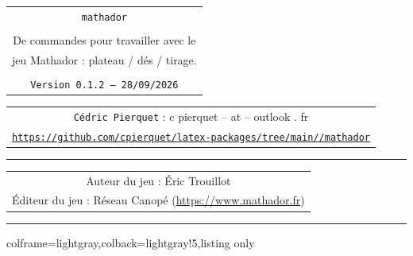 \documentclass[11pt,a4paper]{ltxdoc}
\def\TPversion{0.1.2}
\def\TPdate{28/09/2026}
\begin{document}
\thispagestyle{empty}

\begin{center}
	\begin{minipage}{0.88\linewidth}
		\begin{tcolorbox}[colframe=yellow,colback=yellow!15]
			\begin{center}
				\renewcommand{\arraystretch}{1.25}%
				\begin{tabular}{c}
					{\Huge \texttt{mathador}}\\
					\\
					{\LARGE De commandes pour travailler avec le} \\
					{\LARGE jeu Mathador : plateau / dés / tirage.} \\
					\\
					{\small \texttt{Version \TPversion{} -- \TPdate}}
				\end{tabular}
			\end{center}
		\end{tcolorbox}
	\end{minipage}
\end{center}

\begin{center}
	\begin{tabular}{c}
		\texttt{Cédric Pierquet} : {\ttfamily c pierquet -- at -- outlook . fr}\\
		\texttt{\url{https://github.com/cpierquet/latex-packages/tree/main//mathador}} \\
	\end{tabular}
\end{center}

\hrule

\begin{center}
	\begin{tabular}{c}
		{\ttfamily Auteur du jeu :  Éric Trouillot}\\
		{\ttfamily Éditeur du jeu :  Réseau Canopé (\url{https://www.mathador.fr})}
	\end{tabular}
\end{center}

\hrule

\vfill

\begin{tcblisting}{colframe=lightgray,colback=lightgray!5,listing only}
\end{tcblisting}

\begin{tcolorbox}[colframe=lightgray,colback=lightgray!5]
\hfill{}\hfill\null
\end{tcolorbox}
\end{document}

